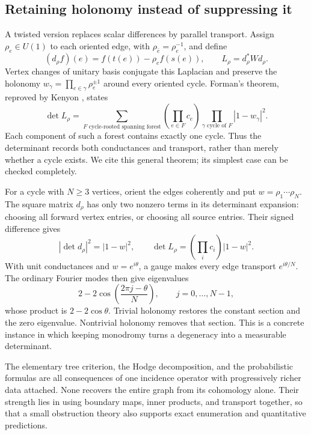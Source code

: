 \documentclass[11pt]{article}
\theoremstyle{definition}
\theoremstyle{remark}
\begin{document}
\subsection{Retaining holonomy instead of suppressing it}

A twisted version replaces scalar differences by parallel transport. Assign $\rho_e\in U(1)$ to each oriented edge, with $\rho_{\bar e}=\rho_e^{-1}$, and define
\[
 (d_\rho f)(e)=f(t(e))-\rho_e f(s(e)),\qquad
 L_\rho=d_\rho^*W d_\rho.
\]
Vertex changes of unitary basis conjugate this Laplacian and preserve the holonomy $w_\gamma=\prod_{e\in\gamma}\rho_e^{\pm1}$ around every oriented cycle. Forman's theorem, reproved by Kenyon \cite{glinKenyon2011}, states
\begin{equation}\label{eq:glin-crsf}
 \det L_\rho=
 \sum_{F\text{ cycle-rooted spanning forest}}
 \left(\prod_{e\in F}c_e\right)
 \prod_{\gamma\text{ cycle of }F}|1-w_\gamma|^2.
\end{equation}
Each component of such a forest contains exactly one cycle. Thus the determinant records both conductances and transport, rather than merely whether a cycle exists. We cite this general theorem; its simplest case can be checked completely.

For a cycle with $N\ge3$ vertices, orient the edges coherently and put $w=\rho_1\cdots\rho_N$. The square matrix $d_\rho$ has only two nonzero terms in its determinant expansion: choosing all forward vertex entries, or choosing all source entries. Their signed difference gives
\[
 |\det d_\rho|^2=|1-w|^2,
 \qquad
 \det L_\rho=\left(\prod_i c_i\right)|1-w|^2.
\]
With unit conductances and $w=e^{i\theta}$, a gauge makes every edge transport $e^{i\theta/N}$. The ordinary Fourier modes then give eigenvalues
\[
 2-2\cos\left(\frac{2\pi j-\theta}{N}\right),
 \qquad j=0,\ldots,N-1,
\]
whose product is $2-2\cos\theta$. Trivial holonomy restores the constant section and the zero eigenvalue. Nontrivial holonomy removes that section. This is a concrete instance in which keeping monodromy turns a degeneracy into a measurable determinant.

The elementary tree criterion, the Hodge decomposition, and the probabilistic formulas are all consequences of one incidence operator with progressively richer data attached. None recovers the entire graph from its cohomology alone. Their strength lies in using boundary maps, inner products, and transport together, so that a small obstruction theory also supports exact enumeration and quantitative predictions.
\end{document}
